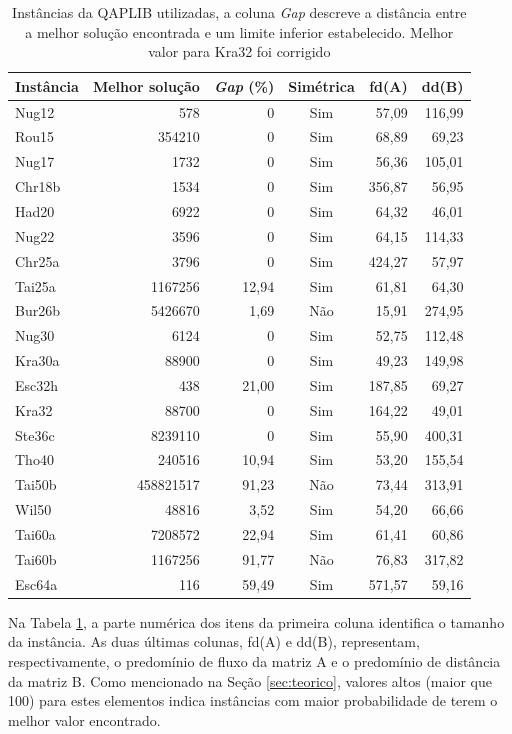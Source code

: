 \begin{table}[H]
  \caption{Instâncias da QAPLIB utilizadas\label{qapinst},
 a coluna
\textit{Gap} descreve a distância entre a melhor solução encontrada e
um limite inferior estabelecido. Melhor valor para Kra32 foi corrigido}
  \centering
  \begin{tabular}{l r r c r r}
    \toprule
    Instância & Melhor solução & \textit{Gap} (\%) & Simétrica & fd(A) & dd(B)\\
    \midrule
    Nug12 & 578 & 0 & Sim & 57,09 & 116,99\\
    Rou15 & 354210 & 0 & Sim & 68,89 & 69,23 \\
    Nug17 & 1732 & 0 & Sim & 56,36 & 105,01 \\
    Chr18b & 1534 & 0 & Sim & 356,87 & 56,95 \\
    Had20 & 6922 & 0 & Sim & 64,32 & 46,01 \\
    Nug22 & 3596 & 0 & Sim & 64,15 & 114,33\\
    Chr25a & 3796 & 0 & Sim & 424,27 & 57,97 \\
    Tai25a & 1167256 & 12,94 & Sim & 61,81 & 64,30\\
    Bur26b & 5426670 & 1,69 & Não & 15,91 & 274,95 \\
    Nug30 & 6124 & 0 & Sim & 52,75 & 112,48 \\
    Kra30a & 88900 & 0 & Sim & 49,23 & 149,98 \\
    Esc32h & 438 & 21,00 & Sim & 187,85 & 69,27 \\
    Kra32  & 88700 & 0 & Sim & 164,22 & 49,01 \\
    Ste36c & 8239110 & 0 & Sim & 55,90 & 400,31 \\
    Tho40 & 240516 & 10,94 & Sim & 53,20 & 155,54 \\
    Tai50b & 458821517 & 91,23 & Não & 73,44 & 313,91 \\
    Wil50 & 48816 & 3,52 & Sim & 54,20 & 66,66 \\
    Tai60a & 7208572 & 22,94 & Sim & 61,41 & 60,86 \\
    Tai60b & 1167256 & 91,77 & Não & 76,83 & 317,82 \\
    Esc64a & 116 & 59,49 & Sim & 571,57 & 59,16 \\
    \bottomrule
  \end{tabular}
\end{table}

Na Tabela \ref{qapinst}, a parte numérica dos itens da primeira coluna
identifica o tamanho da instância. As duas últimas colunas, fd(A) e
dd(B), representam, respectivamente, o predomínio de fluxo da matriz A
e o predomínio de distância da matriz B. Como mencionado na Seção
\ref{sec:teorico}, valores altos (maior que 100) para estes elementos
indica instâncias com maior probabilidade de terem o melhor valor
encontrado.

